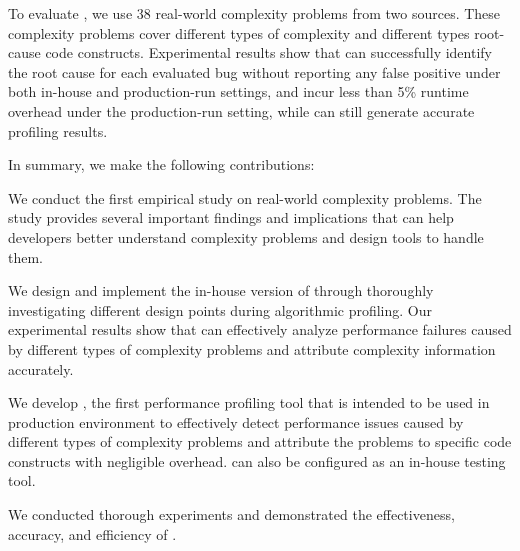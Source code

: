 To evaluate \Tool, we use 38 real-world complexity problems from two sources.
These complexity problems cover different types of 
complexity and different types root-cause code constructs. 
Experimental results show that \Tool can successfully identify the 
root cause for each evaluated bug without reporting 
any false positive under both in-house and production-run settings, 
and incur less than 5\% runtime overhead under the production-run setting, 
while can still generate accurate profiling results.  


In summary, we make the following contributions:

\begin{itemize*}

\item We conduct the first empirical study on real-world complexity problems.
The study provides several important findings and implications that can
help developers better understand complexity problems and design tools
to handle them. 


\item We design and implement the in-house version of \Tool through
thoroughly investigating different design points during algorithmic profiling.
Our experimental results show that \Tool can effectively analyze performance failures
caused by different types of complexity problems and attribute complexity information accurately.

\fi

\item We develop   \Tool, the first performance profiling tool that is intended to be used
in production environment to effectively detect performance
issues caused by different types of complexity problems and attribute the 
problems to specific code constructs with negligible
overhead.  
\Tool can also be configured as an in-house testing tool. 

\item We conducted thorough experiments and demonstrated the effectiveness, accuracy, and efficiency of \Tool. 




\end{itemize*}
